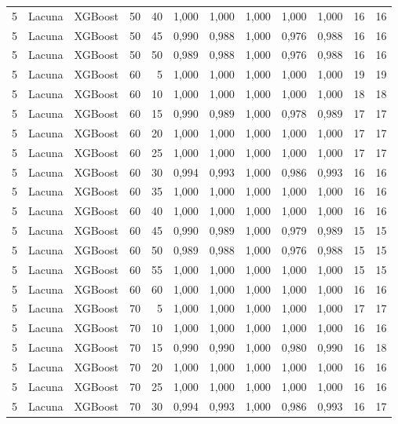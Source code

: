 \begin{longtable}{ccclrrrrrrrr}
5 & Lacuna & XGBoost & 50 & 40 & 1,000 & 1,000 & 1,000 & 1,000 & 1,000 & 16 & 16 \\
5 & Lacuna & XGBoost & 50 & 45 & 0,990 & 0,988 & 1,000 & 0,976 & 0,988 & 16 & 16 \\
5 & Lacuna & XGBoost & 50 & 50 & 0,989 & 0,988 & 1,000 & 0,976 & 0,988 & 16 & 16 \\
5 & Lacuna & XGBoost & 60 & 5 & 1,000 & 1,000 & 1,000 & 1,000 & 1,000 & 19 & 19 \\
5 & Lacuna & XGBoost & 60 & 10 & 1,000 & 1,000 & 1,000 & 1,000 & 1,000 & 18 & 18 \\
5 & Lacuna & XGBoost & 60 & 15 & 0,990 & 0,989 & 1,000 & 0,978 & 0,989 & 17 & 17 \\
5 & Lacuna & XGBoost & 60 & 20 & 1,000 & 1,000 & 1,000 & 1,000 & 1,000 & 17 & 17 \\
5 & Lacuna & XGBoost & 60 & 25 & 1,000 & 1,000 & 1,000 & 1,000 & 1,000 & 17 & 17 \\
5 & Lacuna & XGBoost & 60 & 30 & 0,994 & 0,993 & 1,000 & 0,986 & 0,993 & 16 & 16 \\
5 & Lacuna & XGBoost & 60 & 35 & 1,000 & 1,000 & 1,000 & 1,000 & 1,000 & 16 & 16 \\
5 & Lacuna & XGBoost & 60 & 40 & 1,000 & 1,000 & 1,000 & 1,000 & 1,000 & 16 & 16 \\
5 & Lacuna & XGBoost & 60 & 45 & 0,990 & 0,989 & 1,000 & 0,979 & 0,989 & 15 & 15 \\
5 & Lacuna & XGBoost & 60 & 50 & 0,989 & 0,988 & 1,000 & 0,976 & 0,988 & 15 & 15 \\
5 & Lacuna & XGBoost & 60 & 55 & 1,000 & 1,000 & 1,000 & 1,000 & 1,000 & 15 & 15 \\
5 & Lacuna & XGBoost & 60 & 60 & 1,000 & 1,000 & 1,000 & 1,000 & 1,000 & 16 & 16 \\
5 & Lacuna & XGBoost & 70 & 5 & 1,000 & 1,000 & 1,000 & 1,000 & 1,000 & 17 & 17 \\
5 & Lacuna & XGBoost & 70 & 10 & 1,000 & 1,000 & 1,000 & 1,000 & 1,000 & 16 & 16 \\
5 & Lacuna & XGBoost & 70 & 15 & 0,990 & 0,990 & 1,000 & 0,980 & 0,990 & 16 & 18 \\
5 & Lacuna & XGBoost & 70 & 20 & 1,000 & 1,000 & 1,000 & 1,000 & 1,000 & 16 & 16 \\
5 & Lacuna & XGBoost & 70 & 25 & 1,000 & 1,000 & 1,000 & 1,000 & 1,000 & 16 & 16 \\
5 & Lacuna & XGBoost & 70 & 30 & 0,994 & 0,993 & 1,000 & 0,986 & 0,993 & 16 & 17 \\

\end{longtable}
